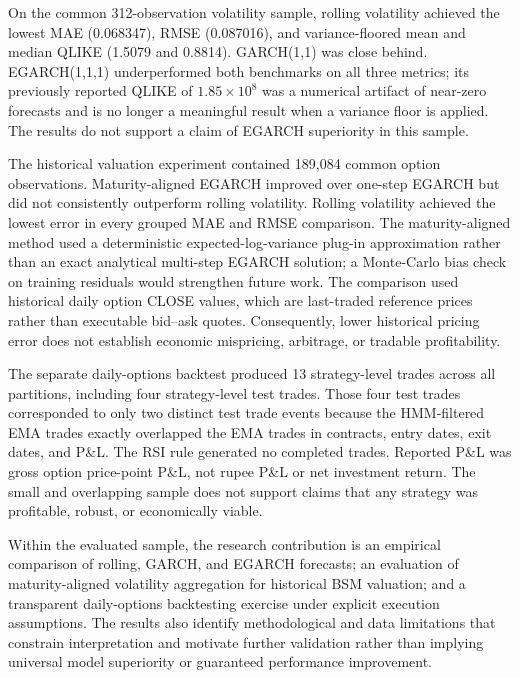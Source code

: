 \documentclass[journal]{IEEEtran}
\begin{document}
On the common 312-observation volatility sample, rolling volatility achieved the lowest MAE (0.068347), RMSE (0.087016), and variance-floored mean and median QLIKE (1.5079 and 0.8814). GARCH(1,1) was close behind. EGARCH(1,1,1) underperformed both benchmarks on all three metrics; its previously reported QLIKE of $1.85\times10^{8}$ was a numerical artifact of near-zero forecasts and is no longer a meaningful result when a variance floor is applied. The results do not support a claim of EGARCH superiority in this sample.

The historical valuation experiment contained 189{,}084 common option observations. Maturity-aligned EGARCH improved over one-step EGARCH but did not consistently outperform rolling volatility. Rolling volatility achieved the lowest error in every grouped MAE and RMSE comparison. The maturity-aligned method used a deterministic expected-log-variance plug-in approximation rather than an exact analytical multi-step EGARCH solution; a Monte-Carlo bias check on training residuals would strengthen future work. The comparison used historical daily option CLOSE values, which are last-traded reference prices rather than executable bid--ask quotes. Consequently, lower historical pricing error does not establish economic mispricing, arbitrage, or tradable profitability.

The separate daily-options backtest produced 13 strategy-level trades across all partitions, including four strategy-level test trades. Those four test trades corresponded to only two distinct test trade events because the HMM-filtered EMA trades exactly overlapped the EMA trades in contracts, entry dates, exit dates, and P\&L. The RSI rule generated no completed trades. Reported P\&L was gross option price-point P\&L, not rupee P\&L or net investment return. The small and overlapping sample does not support claims that any strategy was profitable, robust, or economically viable.

Within the evaluated sample, the research contribution is an empirical comparison of rolling, GARCH, and EGARCH forecasts; an evaluation of maturity-aligned volatility aggregation for historical BSM valuation; and a transparent daily-options backtesting exercise under explicit execution assumptions. The results also identify methodological and data limitations that constrain interpretation and motivate further validation rather than implying universal model superiority or guaranteed performance improvement.
\end{document}
